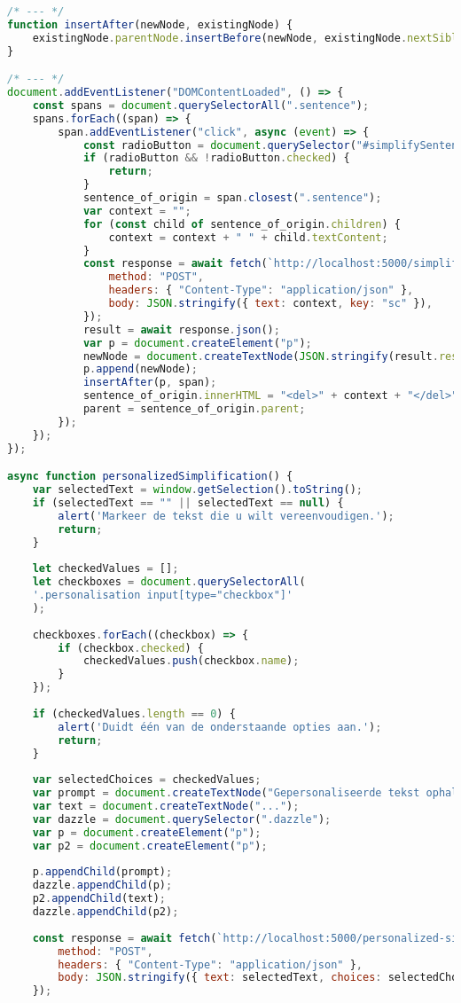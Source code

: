 \begin{lstlisting}[language=JavaScript, caption={De toegepaste scripts voor enkel het scholierencomponent.}, label={code:js-scholars}]
/* --- */
function insertAfter(newNode, existingNode) {
	existingNode.parentNode.insertBefore(newNode, existingNode.nextSibling);
}

/* --- */
document.addEventListener("DOMContentLoaded", () => {
	const spans = document.querySelectorAll(".sentence");
	spans.forEach((span) => {
		span.addEventListener("click", async (event) => {
			const radioButton = document.querySelector("#simplifySentences"); // get reference to radio button
			if (radioButton && !radioButton.checked) {
				return;
			}
			sentence_of_origin = span.closest(".sentence");
			var context = "";
			for (const child of sentence_of_origin.children) {
				context = context + " " + child.textContent;
			}
			const response = await fetch(`http://localhost:5000/simplify`, {
				method: "POST",
				headers: { "Content-Type": "application/json" },
				body: JSON.stringify({ text: context, key: "sc" }),
			});
			result = await response.json();
			var p = document.createElement("p");
			newNode = document.createTextNode(JSON.stringify(result.result));
			p.append(newNode);
			insertAfter(p, span);
			sentence_of_origin.innerHTML = "<del>" + context + "</del>";
			parent = sentence_of_origin.parent;
		});
	});
});

async function personalizedSimplification() {
	var selectedText = window.getSelection().toString();
	if (selectedText == "" || selectedText == null) {
		alert('Markeer de tekst die u wilt vereenvoudigen.');
		return;
	}
	
	let checkedValues = [];
	let checkboxes = document.querySelectorAll(
	'.personalisation input[type="checkbox"]'
	);
	
	checkboxes.forEach((checkbox) => {
		if (checkbox.checked) {
			checkedValues.push(checkbox.name);
		}
	});
	
	if (checkedValues.length == 0) {
		alert('Duidt één van de onderstaande opties aan.');
		return;
	}
	
	var selectedChoices = checkedValues;
	var prompt = document.createTextNode("Gepersonaliseerde tekst ophalen...");
	var text = document.createTextNode("...");
	var dazzle = document.querySelector(".dazzle");
	var p = document.createElement("p");
	var p2 = document.createElement("p");
	
	p.appendChild(prompt);
	dazzle.appendChild(p);
	p2.appendChild(text);
	dazzle.appendChild(p2);
	
	const response = await fetch(`http://localhost:5000/personalized-simplify`, {
		method: "POST",
		headers: { "Content-Type": "application/json" },
		body: JSON.stringify({ text: selectedText, choices: selectedChoices }),
	});
	

\end{lstlisting}
